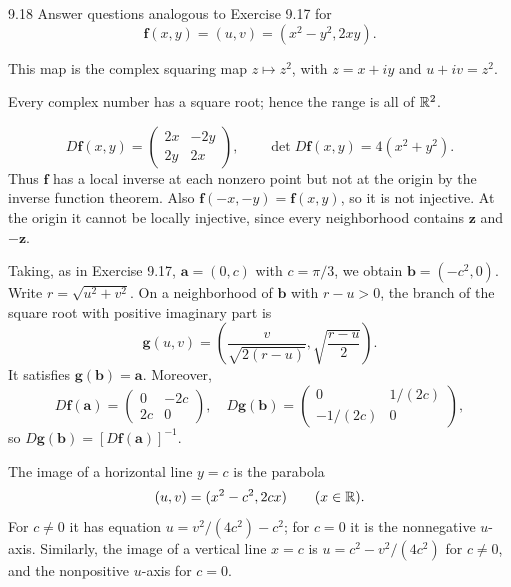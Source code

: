 \documentclass[11pt,oneside]{article}
\begin{document}
\begin{exercise}{9.18}
Answer questions analogous to Exercise 9.17 for
\[
 \mathbf f(x,y)=(u,v)=(x^2-y^2,2xy).
\]
\end{exercise}
\begin{solution}
This map is the complex squaring map $z\mapsto z^2$, with $z=x+iy$ and $u+iv=z^2$.
\begin{exercisesubparts}
\item Every complex number has a square root; hence the range is all of $\mathbb{R}^2$.
\item
\[
 D\mathbf f(x,y)=\begin{pmatrix}2x&-2y\\2y&2x\end{pmatrix},
 \qquad \det D\mathbf f(x,y)=4(x^2+y^2).
\]
Thus $\mathbf f$ has a local inverse at each nonzero point but not at the origin by the inverse function theorem. Also $\mathbf f(-x,-y)=\mathbf f(x,y)$, so it is not injective. At the origin it cannot be locally injective, since every neighborhood contains $\mathbf z$ and $-\mathbf z$.
\item Taking, as in Exercise 9.17, $\mathbf a=(0,c)$ with $c=\pi/3$, we obtain $\mathbf b=(-c^2,0)$. Write $r=\sqrt{u^2+v^2}$. On a neighborhood of $\mathbf b$ with $r-u>0$, the branch of the square root with positive imaginary part is
\[
 \mathbf g(u,v)=\left(
   \frac{v}{\sqrt{2(r-u)}},\sqrt{\frac{r-u}{2}}
 \right).
\]
It satisfies $\mathbf g(\mathbf b)=\mathbf a$. Moreover,
\[
 D\mathbf f(\mathbf a)=\begin{pmatrix}0&-2c\\2c&0\end{pmatrix},
 \quad D\mathbf g(\mathbf b)=\begin{pmatrix}0&1/(2c)\\-1/(2c)&0\end{pmatrix},
\]
so $D\mathbf g(\mathbf b)=[D\mathbf f(\mathbf a)]^{-1}$.
\item The image of a horizontal line $y=c$ is the parabola
\[
 (u,v)=(x^2-c^2,2cx)\qquad(x\in\mathbb{R}).
\]
For $c\ne0$ it has equation $u=v^2/(4c^2)-c^2$; for $c=0$ it is the nonnegative $u$-axis. Similarly, the image of a vertical line $x=c$ is $u=c^2-v^2/(4c^2)$ for $c\ne0$, and the nonpositive $u$-axis for $c=0$.
\end{exercisesubparts}
\end{solution}
\end{document}
